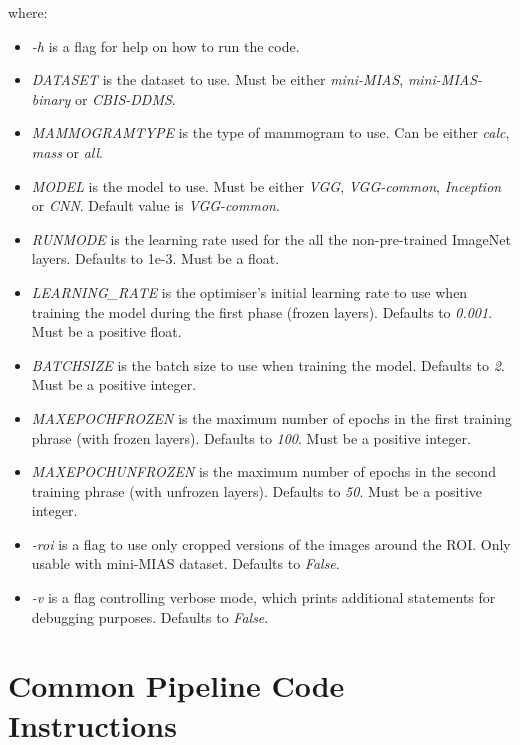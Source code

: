 where:
\begin{itemize}
    \item \textit{-h} is a  flag for help on how to run the code.
    \item \textit{DATASET} is the dataset to use. Must be either \textit{mini-MIAS}, \textit{mini-MIAS-binary} or \textit{CBIS-DDMS}.
    \item \textit{MAMMOGRAMTYPE} is the type of mammogram to use. Can be either \textit{calc}, \textit{mass} or \textit{all}.
    \item \textit{MODEL} is the model to use. Must be either \textit{VGG}, \textit{VGG-common}, \textit{Inception} or \textit{CNN}. Default value is \textit{VGG-common}.
    \item \textit{RUNMODE} is the learning rate used for the all the non-pre-trained ImageNet layers. Defaults to 1e-3. Must be a float.
    \item \textit{LEARNING\_RATE} is the optimiser's initial learning rate to use when training the model during the first phase (frozen layers). Defaults to \textit{0.001}. Must be a positive float.
    \item \textit{BATCHSIZE} is the batch size to use when training the model. Defaults to \textit{2}. Must be a positive integer.
    \item \textit{MAXEPOCHFROZEN} is the maximum number of epochs in the first training phrase (with frozen layers). Defaults to \textit{100}. Must be a positive integer.
    \item \textit{MAXEPOCHUNFROZEN} is the maximum number of epochs in the second training phrase (with unfrozen layers). Defaults to \textit{50}. Must be a positive integer.
    \item \textit{-roi} is a flag to use only cropped versions of the images around the ROI. Only usable with mini-MIAS dataset. Defaults to \textit{False}.
    \item \textit{-v} is a flag controlling verbose mode, which prints additional statements for debugging purposes. Defaults to \textit{False}.
\end{itemize}


\section{Common Pipeline Code Instructions}
\label{sec:appendix-common-pipeline-instructions}


